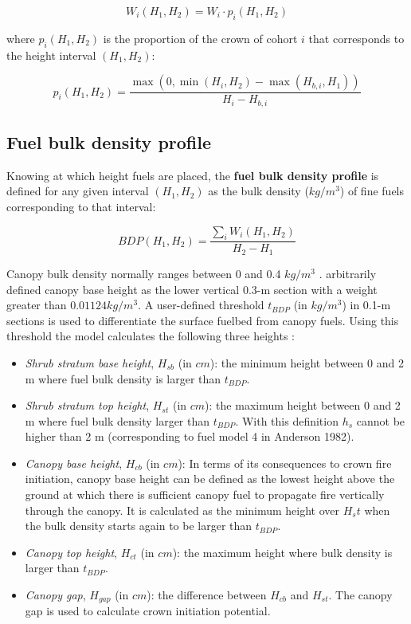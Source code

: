 \documentclass[]{book}
\providecommand{\tightlist}{%
  \setlength{\itemsep}{0pt}\setlength{\parskip}{0pt}}
\begin{document}
\begin{equation}
W_i(H_1, H_2) = W_i\cdot p_i(H_1, H_2)
\end{equation}

where \(p_i(H_1, H_2)\) is the proportion of the crown of cohort \(i\)
that corresponds to the height interval \((H_1, H_2)\):

\begin{equation}
p_i(H_1, H_2) = \frac{\max(0, \min(H_i, H_2) - \max(H_{b,i}, H_1))}{H_{i}-H_{b,i}}
\end{equation}

\subsection{Fuel bulk density profile}\label{fuel-bulk-density-profile}

Knowing at which height fuels are placed, the \textbf{fuel bulk density
profile} \citep{Reinhardt2006} is defined for any given interval
\((H_1, H_2)\) as the bulk density (\(kg/m^3\)) of fine fuels
corresponding to that interval:

\begin{equation}
BDP(H_1, H_2) = \frac{\sum_{i} W_i(H_1, H_2)}{H_2-H_1}
\end{equation}

Canopy bulk density normally ranges between 0 and 0.4 \(kg/m^3\)
\citep{Scott2002}. \citet{Sando1972} arbitrarily defined canopy base
height as the lower vertical 0.3-m section with a weight greater than
\(0.01124 kg/m^3\). A user-defined threshold \(t_{BDP}\) (in \(kg/m^3\))
in 0.1-m sections is used to differentiate the surface fuelbed from
canopy fuels. Using this threshold the model calculates the following
three heights \citep{Reinhardt2006}:

\begin{itemize}
\tightlist
\item
  \emph{Shrub stratum base height}, \(H_{sb}\) (in \(cm\)): the minimum
  height between 0 and 2 m where fuel bulk density is larger than
  \(t_{BDP}\).
\item
  \emph{Shrub stratum top height}, \(H_{st}\) (in \(cm\)): the maximum
  height between 0 and 2 m where fuel bulk density larger than
  \(t_{BDP}\). With this definition \(h_{s}\) cannot be higher than 2 m
  (corresponding to fuel model 4 in Anderson 1982).
\item
  \emph{Canopy base height}, \(H_{cb}\) (in \(cm\)): In terms of its
  consequences to crown fire initiation, canopy base height can be
  defined as the lowest height above the ground at which there is
  sufficient canopy fuel to propagate fire vertically through the
  canopy. It is calculated as the minimum height over \(H_st\) when the
  bulk density starts again to be larger than \(t_{BDP}\).
\item
  \emph{Canopy top height}, \(H_{ct}\) (in \(cm\)): the maximum height
  where bulk density is larger than \(t_{BDP}\).
\item
  \emph{Canopy gap}, \(H_{gap}\) (in \(cm\)): the difference between
  \(H_{cb}\) and \(H_{st}\). The canopy gap is used to calculate crown
  initiation potential.
\end{itemize}
\end{document}

